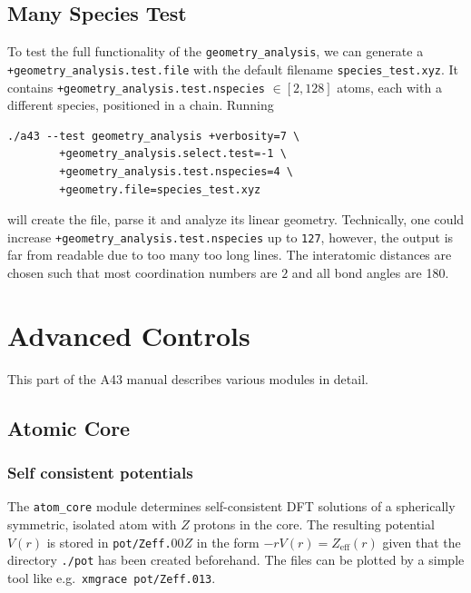 \documentclass[oribibl]{llncs}
\newcommand{\um}[1]{_{\mathrm{#1}}}
\newcommand{\ttt}[1]{\texttt{#1}}
\newcommand{\codename}{A43}
\begin{document}
%
%
\subsection{Many Species Test} \label{sec:many-species-test}
%
To test the full functionality of the \ttt{geometry\_analysis},
we can generate a \ttt{+geometry\_analysis.test.file} 
with the default filename \ttt{species\_test.xyz}.
It contains \ttt{+geometry\_analysis.test.nspecies} $\in [2, 128]$ atoms, each with a
different species, positioned in a chain. Running
\begin{verbatim}
./a43 --test geometry_analysis +verbosity=7 \
        +geometry_analysis.select.test=-1 \
        +geometry_analysis.test.nspecies=4 \
        +geometry.file=species_test.xyz
\end{verbatim}
will create the file, parse it and analyze its linear geometry.
Technically, one could increase \ttt{+geometry\_analysis.test.nspecies} up to \ttt{127},
however, the output is far from readable due to too many too long lines.
The interatomic distances are chosen such that most coordination numbers
are $2$ and all bond angles are 180\degree{}.
%

\newpage

\section{Advanced Controls} \label{sec:advanced-controls}
%
This part of the \codename{} manual describes
various modules in detail.


\subsection{Atomic Core} \label{sec:atom-core}
%
\subsubsection{Self consistent potentials}
%
The \ttt{atom\_core} module determines self-consistent \ac{DFT} solutions
of a spherically symmetric, isolated atom with $Z$ protons in the core.
The resulting potential $V(r)$ is stored in \ttt{pot/Zeff.}$00Z$
in the form $-rV(r) = Z\um{eff}(r)$ given that the directory \ttt{./pot} has been created beforehand.
The files can be plotted by a simple tool like e.g.~\ttt{xmgrace pot/Zeff.013}.
\end{document}

